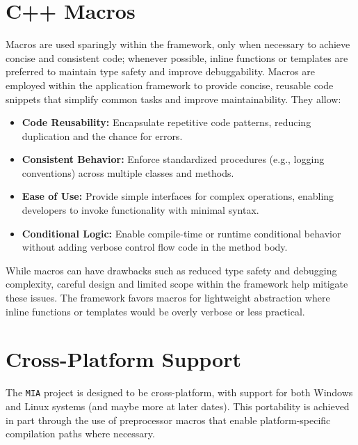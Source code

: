 \section{C++ Macros}\label{sec:cpp_macros}
Macros are used sparingly within the framework, only when necessary to achieve concise and consistent code; whenever possible, inline functions or templates are preferred to maintain type safety and improve debuggability. Macros are employed within the application framework to provide concise, reusable code snippets that simplify common tasks and improve maintainability. They allow:
\begin{itemize}
    \item \textbf{Code Reusability:} Encapsulate repetitive code patterns, reducing duplication and the chance for errors.
    \item \textbf{Consistent Behavior:} Enforce standardized procedures (e.g., logging conventions) across multiple classes and methods.
    \item \textbf{Ease of Use:} Provide simple interfaces for complex operations, enabling developers to invoke functionality with minimal syntax.
    \item \textbf{Conditional Logic:} Enable compile-time or runtime conditional behavior without adding verbose control flow code in the method body.
\end{itemize}
While macros can have drawbacks such as reduced type safety and debugging complexity, careful design and limited scope within the framework help mitigate these issues. The framework favors macros for lightweight abstraction where inline functions or templates would be overly verbose or less practical.
















\section{Cross-Platform Support}

The \texttt{MIA} project is designed to be cross-platform, with support for both Windows and Linux systems (and maybe more at later dates). This portability is achieved in part through the use of preprocessor macros that enable platform-specific compilation paths where necessary.

